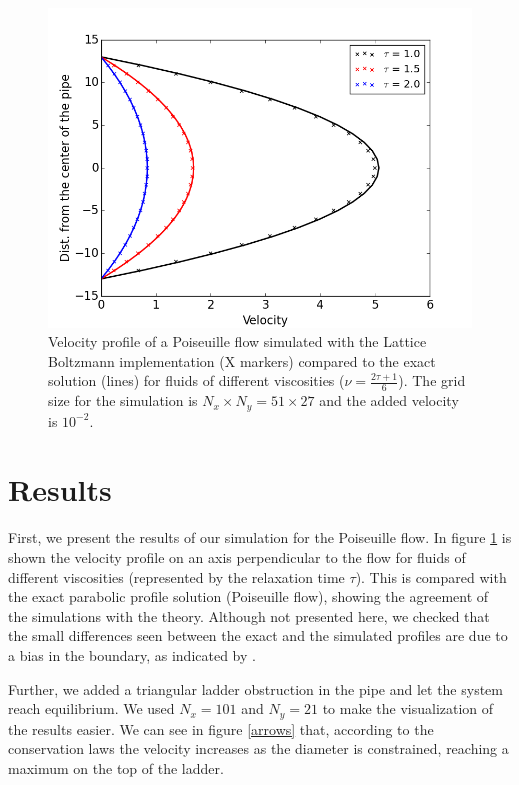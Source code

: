 \documentclass[aps,prl,reprint,groupedaddress]{revtex4-1}
\begin{document}
\begin{figure}[ht]
	\includegraphics[scale=0.4]{poiseuille.png}
	\caption{Velocity profile of a Poiseuille flow simulated with the Lattice Boltzmann implementation (X markers) compared to the exact solution (lines) for fluids of different viscosities ($\nu = \frac{2\tau + 1}{6}$). The grid size for the simulation is $N_x \times N_y = 51 \times 27$ and the added velocity is $10^{-2}$. \label{poiseuille}}
\end{figure}

\section{Results}

First, we present the results of our simulation for the Poiseuille flow. In figure \ref{poiseuille} is shown the velocity profile on an axis perpendicular to the flow for fluids of different viscosities (represented by the relaxation time $\tau$). This is compared with the exact parabolic profile solution (Poiseuille flow), showing the agreement of the simulations with the theory. Although not presented here, we checked that the small differences seen between the exact and the simulated profiles are due to a bias in the boundary, as indicated by \cite{He1997a}.

Further, we added a triangular ladder obstruction in the pipe and let the system reach equilibrium. We used $N_x=101$ and $N_y=21$ to make the visualization of the results easier. We can see in figure \ref{arrows} that, according to the conservation laws the velocity increases as the diameter is constrained, reaching a maximum on the top of the ladder.
\end{document}
